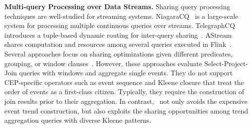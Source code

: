 \textbf{Multi-query Processing over Data Streams.} Sharing query processing techniques are well-studied for streaming systems. NiagaraCQ~\cite{10.1145/342009.335432} is a large-scale system for processing multiple continuous queries over streams. TelegraphCQ~\cite{DBLP:conf/cidr/ChandrasekaranDFHHKMRRS03} introduces a tuple-based dynamic routing for inter-query sharing~\cite{10.1145/564691.564698}. 
AStream~\cite{KRM19} shares computation and resources among several queries executed in Flink~\cite{flink}.
Several approaches focus on sharing optimizations given different predicates, grouping, or window clauses~\cite{AW04,GSCL12,HFAE03,KWF06,LMTPT05,TKPP20,ZKOSZ10}. However, these approaches evaluate Select-Project-Join queries with windows and aggregate single events. They do not support CEP-specific operators such as event sequence and Kleene closure that treat the order of events as a first-class citizen. Typically, they require the construction of join results prior to their aggregation. In contrast, \app\ not only avoids the expensive event trend construction, but also exploits the sharing opportunities among trend aggregation queries with diverse Kleene patterns.

